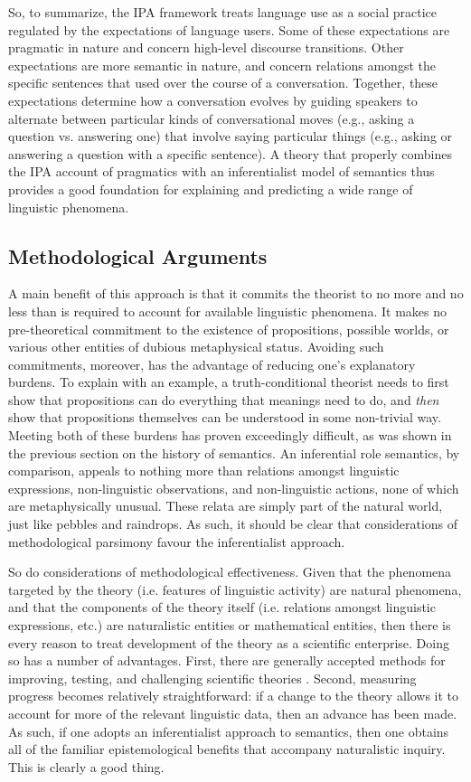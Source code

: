 So, to summarize, the IPA framework treats language use as a social practice regulated by the expectations of language users. Some of these expectations are pragmatic in nature and concern high-level discourse transitions. Other expectations are more semantic in nature, and concern relations amongst the specific sentences that used over the course of a conversation. Together, these expectations determine how a conversation evolves by guiding speakers to alternate between particular kinds of conversational moves (e.g., asking a question vs. answering one) that involve saying particular things (e.g., asking or answering a question with a specific sentence). A theory that properly combines the IPA account of pragmatics with an inferentialist model of semantics thus provides a good foundation for explaining and predicting a wide range of linguistic phenomena. 

\subsection{Methodological Arguments}

A main benefit of this approach is that it commits the theorist to no more and no less than is required to account for available linguistic phenomena. It makes no pre-theoretical commitment to the existence of propositions, possible worlds, or various other entities of dubious metaphysical status. Avoiding such commitments, moreover, has the advantage of reducing one's explanatory burdens. To explain with an example, a truth-conditional theorist needs to first show that propositions can do everything that meanings need to do, and \textit{then} show that propositions themselves can be understood in some non-trivial way. Meeting both of these burdens has proven exceedingly difficult, as was shown in the previous section on the history of semantics. An inferential role semantics, by comparison, appeals to nothing more than relations amongst linguistic expressions, non-linguistic observations, and non-linguistic actions, none of which are metaphysically unusual. These relata are simply part of the natural world, just like pebbles and raindrops. As such, it should be clear that considerations of methodological parsimony favour the inferentialist approach. 

So do considerations of methodological effectiveness. Given that the phenomena targeted by the theory (i.e. features of linguistic activity) are natural phenomena, and that the components of the theory itself (i.e. relations amongst linguistic expressions, etc.) are naturalistic entities or mathematical entities, then there is every reason to treat development of the theory as a scientific enterprise. Doing so has a number of advantages. First, there are generally accepted methods for improving, testing, and challenging scientific theories \citep{GodfreySmith:2002}. Second, measuring progress becomes relatively straightforward: if a change to the theory allows it to account for more of the relevant linguistic data, then an advance has been made. As such, if one adopts an inferentialist approach to semantics, then one obtains all of the familiar epistemological benefits that accompany naturalistic inquiry. This is clearly a good thing.

